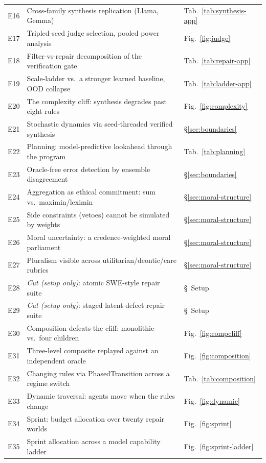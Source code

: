 \documentclass[11pt]{article}
\begin{document}
\begin{longtable}{@{}r p{} l@{}}
E16 & Cross-family synthesis replication (Llama, Gemma) & Tab.~\ref{tab:synthesis-app} \\
E17 & Tripled-seed judge selection, pooled power analysis & Fig.~\ref{fig:judge} \\
E18 & Filter-vs-repair decomposition of the verification gate & Tab.~\ref{tab:repair-app} \\
E19 & Scale-ladder vs.\ a stronger learned baseline, OOD collapse & Tab.~\ref{tab:ladder-app} \\
E20 & The complexity cliff: synthesis degrades past eight rules & Fig.~\ref{fig:complexity} \\
E21 & Stochastic dynamics via seed-threaded verified synthesis & \S\ref{sec:boundaries} \\
E22 & Planning: model-predictive lookahead through the program & Tab.~\ref{tab:planning} \\
E23 & Oracle-free error detection by ensemble disagreement & \S\ref{sec:boundaries} \\
E24 & Aggregation as ethical commitment: sum vs.\ maximin/leximin & \S\ref{sec:moral-structure} \\
E25 & Side constraints (vetoes) cannot be simulated by weights & \S\ref{sec:moral-structure} \\
E26 & Moral uncertainty: a credence-weighted moral parliament & \S\ref{sec:moral-structure} \\
E27 & Pluralism visible across utilitarian/deontic/care rubrics & \S\ref{sec:moral-structure} \\
E28 & \emph{Cut (setup only)}: atomic SWE-style repair suite & \S~Setup \\
E29 & \emph{Cut (setup only)}: staged latent-defect repair suite & \S~Setup \\
E30 & Composition defeats the cliff: monolithic vs.\ four children & Fig.~\ref{fig:compcliff} \\
E31 & Three-level composite replayed against an independent oracle & Fig.~\ref{fig:composition} \\
E32 & Changing rules via PhasedTransition across a regime switch & Tab.~\ref{tab:composition} \\
E33 & Dynamic traversal: agents move when the rules change & Fig.~\ref{fig:dynamic} \\
E34 & Sprint: budget allocation over twenty repair worlds & Fig.~\ref{fig:sprint} \\
E35 & Sprint allocation across a model capability ladder & Fig.~\ref{fig:sprint-ladder} \\

\end{longtable}
\end{document}
